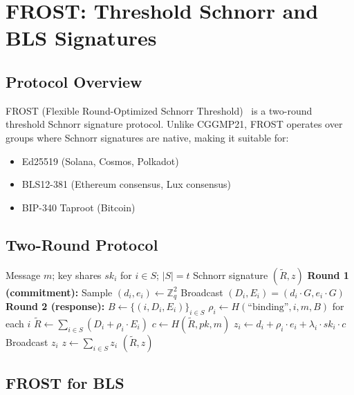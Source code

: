 \section{FROST: Threshold Schnorr and BLS Signatures}

\label{sec:frost}

\subsection{Protocol Overview}

FROST (Flexible Round-Optimized Schnorr Threshold)~\cite{komlo2020frost} is a
two-round threshold Schnorr signature protocol. Unlike CGGMP21, FROST operates
over groups where Schnorr signatures are native, making it suitable for:

\begin{itemize}[leftmargin=2em]
  \item Ed25519 (Solana, Cosmos, Polkadot)
  \item BLS12-381 (Ethereum consensus, Lux consensus)
  \item BIP-340 Taproot (Bitcoin)
\end{itemize}

\subsection{Two-Round Protocol}

\begin{algorithm}[ht]
\caption{FROST Signing.}
\label{alg:frost}
\begin{algorithmic}[1]
\Require Message $m$; key shares $sk_i$ for $i \in S$; $|S| = t$
\Ensure Schnorr signature $(\tilde{R}, z)$
\State \textbf{Round 1 (commitment):}
  \State Sample $(d_i, e_i) \leftarrow \mathbb{Z}_q^2$
  \State Broadcast $(D_i, E_i) = (d_i \cdot G, e_i \cdot G)$
\EndFor
\State \textbf{Round 2 (response):}
\State $B \leftarrow \{(i, D_i, E_i)\}_{i \in S}$
\State $\rho_i \leftarrow H(\text{``binding''}, i, m, B)$ for each $i$
\State $\tilde{R} \leftarrow \sum_{i \in S} (D_i + \rho_i \cdot E_i)$
\State $c \leftarrow H(\tilde{R}, pk, m)$ 
  \State $z_i \leftarrow d_i + \rho_i \cdot e_i + \lambda_i \cdot sk_i \cdot c$
  \State Broadcast $z_i$
\EndFor
\State $z \leftarrow \sum_{i \in S} z_i$
\State \Return $(\tilde{R}, z)$
\end{algorithmic}
\end{algorithm}

\subsection{FROST for BLS}

